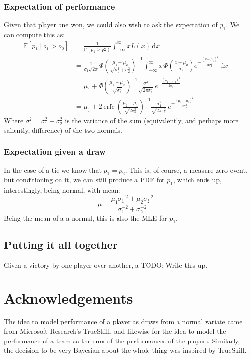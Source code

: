 \documentclass[12pt]{article}
\begin{document}
\subsubsection{Expectation of performance}
Given that player one won, we could also wish to ask the expectation of $p_1$.
We can compute this as:
\begin{align*}
\mathbb{E}[p_1\ |\ p_1 > p_2] &= \frac1{\mathbb{P}(p_1 > p2)} \int_{-\infty}^\infty x L(x) \, \mathrm{d}x \\
&= \frac1{\sigma_1 \sqrt{2\pi}} \Phi\left(\frac{\mu_1 - \mu_2}{\sqrt{\sigma_1^2 + \sigma_2^2}}\right)^{-1} \!
   \int_{-\infty}^\infty x \, \Phi\left(\frac{x - \mu_2}{\sigma_2}\right) e^{-\frac{(x - \mu_1)^2}{2 \sigma_1^2}} \, \mathrm{d}x \\
&= \mu_1 + \Phi\left(\frac{\mu_1 - \mu_2}{\sqrt{\sigma_s^2}}\right)^{-1} \!
   \frac{\sigma_1^2}{\sqrt{2\pi \sigma_s^2}} \, e^{-\frac{(\mu_1 - \mu_2)^2}{2 \sigma_s^2}} \\
&= \mu_1 + 2 \operatorname{erfc}\left(\frac{\mu_2 - \mu_1}{\sqrt{2 \sigma_s^2}}\right)^{-1} \!
   \frac{\sigma_1^2}{\sqrt{2\pi \sigma_s^2}} \, e^{-\frac{(\mu_1 - \mu_2)^2}{2 \sigma_s^2}}
\end{align*}
Where $\sigma_s^2 = \sigma_1^2 + \sigma_2^2$ is the variance of the sum (equivalently, and perhaps more saliently, difference) of the two normals.

\subsubsection{Expectation given a draw}
In the case of a tie we know that $p_1 = p_2$.
This is, of course, a measure zero event, but conditioning on it, we can still produce a PDF for $p_1$, which ends up, interestingly, being normal, with mean:
\[ \mu = \frac{\mu_1 \sigma_1^{-2} + \mu_2 \sigma_2^{-2}}{\sigma_1^{-2} + \sigma_2^{-2}} \]
Being the mean of a a normal, this is also the MLE for $p_1$.

\subsection{Putting it all together}
Given a victory by one player over another, a
TODO: Write this up.

\section{Acknowledgements}
The idea to model performance of a player as draws from a normal variate came from Microsoft Research's TrueSkill, and likewise for the idea to model the performance of a team as the sum of the performances of the players.
Similarly, the decision to be very Bayesian about the whole thing was inspired by TrueSkill.
\end{document}
